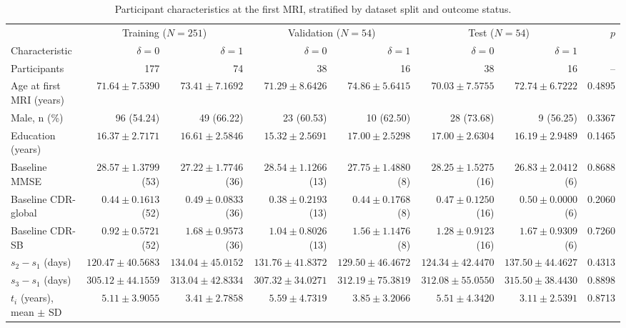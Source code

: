 \begin{landscape}
\begin{table}[p]
\centering\small
\caption[Participant characteristics at the first MRI]{Participant characteristics at the first MRI, stratified by dataset split and outcome status.}
\label{tab:baseline-characteristics}
\setlength{\tabcolsep}{2pt}
\begin{tabular}{@{}lrrrrrrr@{}}
\toprule
& \multicolumn{2}{c}{Training ($N=251$)} & \multicolumn{2}{c}{Validation ($N=54$)} & \multicolumn{2}{c}{Test ($N=54$)} & $p$ \\
\cmidrule(lr){2-3}\cmidrule(lr){4-5}\cmidrule(lr){6-7}
Characteristic & $\delta=0$ & $\delta=1$ & $\delta=0$ & $\delta=1$ & $\delta=0$ & $\delta=1$ & \\
\midrule
Participants & 177 & 74 & 38 & 16 & 38 & 16 & -- \\
Age at first MRI (years) & $71.64 \pm 7.5390$ & $73.41 \pm 7.1692$ & $71.29 \pm 8.6426$ & $74.86 \pm 5.6415$ & $70.03 \pm 7.5755$ & $72.74 \pm 6.7222$ & 0.4895 \\
Male, n (\%) & 96 (54.24) & 49 (66.22) & 23 (60.53) & 10 (62.50) & 28 (73.68) & 9 (56.25) & 0.3367 \\
Education (years) & $16.37 \pm 2.7171$ & $16.61 \pm 2.5846$ & $15.32 \pm 2.5691$ & $17.00 \pm 2.5298$ & $17.00 \pm 2.6304$ & $16.19 \pm 2.9489$ & 0.1465 \\
Baseline MMSE & $28.57 \pm 1.3799$ (53) & $27.22 \pm 1.7746$ (36) & $28.54 \pm 1.1266$ (13) & $27.75 \pm 1.4880$ (8) & $28.25 \pm 1.5275$ (16) & $26.83 \pm 2.0412$ (6) & 0.8688 \\
Baseline CDR-global & $0.44 \pm 0.1613$ (52) & $0.49 \pm 0.0833$ (36) & $0.38 \pm 0.2193$ (13) & $0.44 \pm 0.1768$ (8) & $0.47 \pm 0.1250$ (16) & $0.50 \pm 0.0000$ (6) & 0.2060 \\
Baseline CDR-SB & $0.92 \pm 0.5721$ (52) & $1.68 \pm 0.9573$ (36) & $1.04 \pm 0.8026$ (13) & $1.56 \pm 1.1476$ (8) & $1.28 \pm 0.9123$ (16) & $1.67 \pm 0.9309$ (6) & 0.7260 \\
$s_2-s_1$ (days) & $120.47 \pm 40.5683$ & $134.04 \pm 45.0152$ & $131.76 \pm 41.8372$ & $129.50 \pm 46.4672$ & $124.34 \pm 42.4470$ & $137.50 \pm 44.4627$ & 0.4313 \\
$s_3-s_1$ (days) & $305.12 \pm 44.1559$ & $313.04 \pm 42.8334$ & $307.32 \pm 34.0271$ & $312.19 \pm 75.3819$ & $312.08 \pm 55.0550$ & $315.50 \pm 38.4430$ & 0.8898 \\
$t_i$ (years), mean $\pm$ SD & $5.11 \pm 3.9055$ & $3.41 \pm 2.7858$ & $5.59 \pm 4.7319$ & $3.85 \pm 3.2066$ & $5.51 \pm 4.3420$ & $3.11 \pm 2.5391$ & 0.8713 \\

\end{tabular}
\end{table}
\end{landscape}
